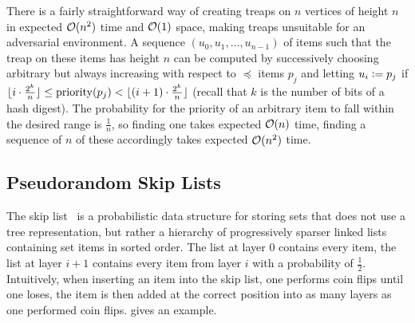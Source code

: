 There is a fairly straightforward way of creating treaps on $n$ vertices of height $n$ in expected $\mathcal{O}(n^2)$ time and $\mathcal{O}(1)$ space, making treaps unsuitable for an adversarial environment. A sequence $(u_0, u_1, \ldots, u_{n - 1})$ of items such that the treap on these items has height $n$ can be computed by successively choosing arbitrary but always increasing with respect to $\preceq$ items $p_j$ and letting $u_i \vcentcolon= p_j$ if $\lfloor i \cdot \frac{2^k}{n}\rfloor \leq \operatorname{priority}(p_j) < \lfloor(i + 1) \cdot \frac{2^k}{n}\rfloor$ (recall that $k$ is the number of bits of a hash digest). The probability for the priority of an arbitrary item to fall within the desired range is $\frac{1}{n}$, so finding one takes expected $\mathcal{O}(n)$ time, finding a sequence of $n$ of these accordingly takes expected $\mathcal{O}(n^2)$ time.

\subsection{Pseudorandom Skip Lists}

The skip list~\cite{pugh1990skip}\cite{pugh1998skip} is a probabilistic data structure for storing sets that does not use a tree representation, but rather a hierarchy of progressively sparser linked lists containing set items in sorted order. The list at layer $0$ contains every item, the list at layer $i + 1$ contains every item from layer $i$ with a probability of $\frac{1}{2}$. Intuitively, when inserting an item into the skip list, one performs coin flips until one loses, the item is then added at the correct position into as many layers as one performed coin flips.  gives an example.

\newcommand{\skiplistnode}[3]{
\node (n#1#2) at (#1, #2) [skiplistnode] {#3};
}

\newcommand{\skiplisttower}[3]{
\foreach \y in {0,...,#2}
{
    \skiplistnode{#1}{\y}{#3}
}
}

\newcommand{\toweredges}[2]{
\foreach \y in {1,...,#2}
{
    \pgfmathtruncatemacro{\myPrev}{\y-1}
    \draw (n#1\y) edge[edge] (n#1\myPrev);
}
}

\newcommand{\listedges}[2]{
\foreach \y in {0,...,#2}
{
    \pgfmathtruncatemacro{\myPrev}{#1-1}
    \draw (n#1\y) edge[edge] (n\myPrev\y);
}
}

